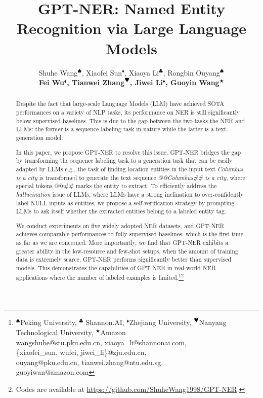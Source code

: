 \documentclass[11pt]{article}
\title{GPT-NER: Named Entity Recognition via Large Language Models}
\author{
Shuhe Wang$^{\spadesuit}$,
Xiaofei Sun$^{\blacklozenge}$,
Xiaoya Li$^{\clubsuit}$,
Rongbin Ouyang$^{\spadesuit}$\\
{\bf Fei Wu$^{\blacklozenge}$,
Tianwei Zhang$^{\heart}$,
Jiwei Li$^{\blacklozenge}$,
Guoyin Wang$^{\bigstar}$} \\
}
\newcommand{\heart}{\text{\small \ding{170}}}
\begin{document}
\maketitle



\begin{abstract}

Despite the fact that
large-scale Language Models (LLM)  
have achieved SOTA performances on a variety of NLP tasks, 
its performance on NER is still significantly below supervised baselines. This is due
to the gap between the two tasks the NER and LLMs: the former is a sequence labeling task in nature while the latter is a text-generation model. 

In this paper, we propose GPT-NER to resolve this issue. 
GPT-NER bridges the gap by transforming the sequence labeling task  
to a generation task that can be easily adapted by 
  LLMs
e.g., the task of finding location entities in the input text {\it Columbus is a city}
is transformed to generate the text sequence 
\textit{@@Columbus\#\# is a city}, where special tokens @@\#\# marks the entity to extract. 
To efficiently 
address the {\it hallucination} issue of LLMs, where LLMs have a strong inclination to over-confidently label NULL inputs as entities, 
we propose a self-verification strategy
by prompting LLMs to 
 ask itself whether the extracted entities belong to a labeled entity tag.

We conduct experiments on five widely adopted NER datasets, and 
GPT-NER achieves comparable performances to fully supervised baselines, which is the first time as far as we are concerned.
More importantly, we find that GPT-NER exhibits a greater ability
 in the low-resource and few-shot setups, when the amount of training data is extremely scarce,   GPT-NER performs significantly better than supervised models.
This demonstrates the capabilities of GPT-NER 
in real-world NER applications where the number of labeled examples is limited.\footnote{\noindent $^{\spadesuit}$Peking University, $^{\clubsuit}$ Shannon.AI, $^{\blacklozenge}$Zhejiang University, $^{\heart}$Nanyang Technological University, $^{\bigstar}$Amazon \\
 wangshuhe@stu.pku.edu.cn, xiaoya\_li@shannonai.com, \\
 \{xiaofei\_sun, wufei, jiwei\_li\}@zju.edu.cn, \\
 ouyang@pku.edu.cn, tianwei.zhang@ntu.edu.sg, \\ guoyiwan@amazon.com
}\footnote{Codes are available at \url{https://github.com/ShuheWang1998/GPT-NER}.}
\end{abstract}
\end{document}

